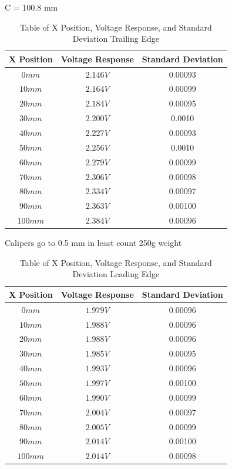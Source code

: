 \documentclass{article}
\begin{document}
C = 100.8 mm

\begin{table}[ht]
\centering
\begin{tabular}{|c|c|c|}
\hline
\textbf{X Position} & \textbf{Voltage Response} & \textbf{Standard Deviation} \\
\hline
$0 mm$ & $2.146 V$ & 0.00093 \\
\hline
$10 mm$ & $2.164 V$ & 0.00099\\
\hline
$20 mm$ & $2.184 V$ & 0.00095\\
\hline
$30 mm$ & $2.200 V$ & 0.0010 \\
\hline
$40 mm$ & $2.227 V$ & 0.00093 \\
\hline
$50 mm$ & $2.256 V$ & 0.0010 \\
\hline
$60 mm$ & $2.279 V$ & 0.00099 \\
\hline
$70 mm$ & $2.306 V$ & 0.00098 \\
\hline
$80 mm$ & $2.334 V$ & 0.00097\\
\hline
$90 mm$ & $2.363 V$ & 0.00100\\
\hline
$100 mm$ & $2.384 V$ & 0.00096\\
\hline
\end{tabular}
\caption{Table of X Position, Voltage Response, and Standard Deviation Trailing Edge}
\label{tab:position_voltage_stddev}
\end{table}

Calipers go to 0.5 mm in least count
250g weight



\begin{table}[ht]
\centering
\begin{tabular}{|c|c|c|}
\hline
\textbf{X Position} & \textbf{Voltage Response} & \textbf{Standard Deviation} \\
\hline
$0 mm$ & $1.979 V$ & 0.00096\\
\hline
$10 mm$ & $1.988 V$ & 0.00096 \\
\hline
$20 mm$ & $1.988 V$ & 0.00096 \\
\hline
$30 mm$ & $1.985 V$ & 0.00095 \\
\hline
$40 mm$ & $1.993 V$ & 0.00096 \\
\hline
$50 mm$ & $1.997 V$ & 0.00100 \\
\hline
$60 mm$ & $1.990 V$ & 0.00099 \\
\hline
$70 mm$ & $2.004 V$ & 0.00097 \\
\hline
$80 mm$ & $2.005 V$ & 0.00099 \\
\hline
$90 mm$ & $2.014 V$ & 0.00100 \\
\hline
$100 mm$ & $2.014 V$ & 0.00098 \\
\hline
\end{tabular}
\caption{Table of X Position, Voltage Response, and Standard Deviation Leading Edge}
\label{tab:position_voltage_stddev2}
\end{table}
\end{document}
